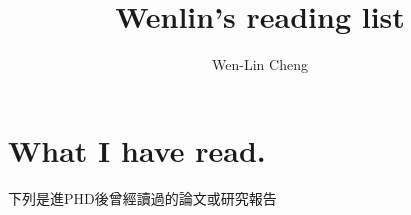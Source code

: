 \documentclass[a4paper]{article}
\title{\textbf{Wenlin's reading list}}
\author{Wen-Lin Cheng}
\begin{document}
\maketitle

\section{What I have read.}
下列是進PHD後曾經讀過的論文或研究報告

 

\end{document}
